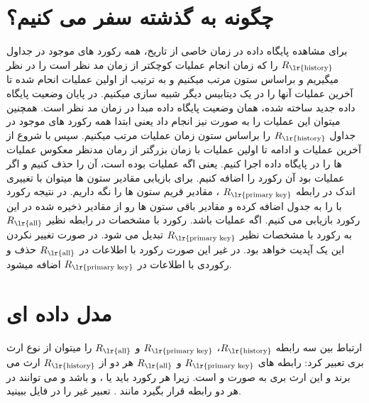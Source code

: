 \documentclass{article}
\newcommand{\txt}[1]{\text{\lr{#1}}}
\begin{document}
	\section*{چگونه به گذشته سفر می کنیم؟}
	برای مشاهده پایگاه داده در زمان خاصی از تاریخ، همه رکورد های موجود در جداول 
	$R_{\txt{history}}$
	را که زمان انجام عملیات کوچکتر از زمان مد نظر است را در نظر میگیریم و براساس ستون 
	مرتب میکنیم و به ترتیب از اولین عملیات انحام شده تا آخرین عملیات آنها را در یک دیتابیس دیگر شبیه سازی میکنیم. در پایان وضعیت پایگاه داده جدید ساخته شده، همان وضعیت پایگاه داده مبدا در زمان مد نظر است. همچنین میتوان این عملیات را به صورت 
	نیز انجام داد یعنی ابتدا همه رکورد های موجود در جداول $R_{\txt{history}}$ را براساس ستون زمان عملیات  مرتب میکنیم. سپس با شروع از آخرین عملیات و ادامه تا اولین عملیات با زمان بزرگتر از رمان مدنظر معکوس عملیات ها را در پایگاه داده اجرا کنیم. یعنی اگه عملیات 
	بوده است، آن را حذف کنیم و اگر عملیات 
	بود آن رکورد را اضافه کنیم. برای بازیابی مقادیر ستون ها میتوان با تغییری اندک در رابطه $R_{\txt{primary key}}$ ، مقادیر قریم ستون ها را نگه داریم. در نتیجه رکورد با 
	را به جدول اضافه کرده و مقادیر باقی ستون ها رو از مقادیر ذخیره شده در این رکورد بازیابی می کنیم. اگه عملیات 
	باشد. رکورد با مشخصات در رابطه نظیر 
	$R_{\txt{all}}$
	به رکورد با مشخصات نظیر $R_{\txt{primary key}}$ تبدیل می شود. در صورت تغییر نکردن 
	این یک آپدیت خواهد بود. در غیر این صورت رکورد با اطلاعات در $R_{\txt{all}}$ حذف و رکوردی با اطلاعات در $R_{\txt{primary key}}$ اضافه میشود.
	
	\section*{مدل داده ای}
	ارتباط بین سه رابطه $R_{\txt{history}}$، $R_{\txt{primary key}}$ و $R_{\txt{all}}$ را میتوان از نوع ارث بری تعبیر کرد: رابطه های $R_{\txt{primary key}}$ و $R_{\txt{all}}$ هر دو از $R_{\txt{history}}$ ارث می برند و این ارث بری به صورت 
	و
	است. زیرا هر رکورد باید یا ،  و  باشد و می توانند در هر دو رابطه قرار بگیرد مانند . تعبیر غیر 
	را در فایل 
	ببینید.
	
\end{document}
